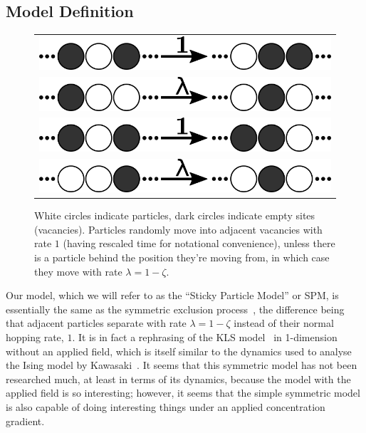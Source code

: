 \subsection{Model Definition}
\begin{figure}
\vspace{1em}
\caption{\label{fig:rates} White circles indicate particles, dark circles indicate empty sites (vacancies). Particles randomly move into adjacent vacancies with rate $1$ (having rescaled time for notational convenience), unless there is a
particle behind the position they're moving from, in which case they move with rate $\lambda=1-\zeta$.}
 \begin{tabular}{c}
    \includegraphics[width=\linewidth]{../tex-src/images/rateDiags/freeLeft} \\
    \includegraphics[width=\linewidth]{../tex-src/images/rateDiags/stickLeft} \\
    \includegraphics[width=\linewidth]{../tex-src/images/rateDiags/freeRight} \\
    \includegraphics[width=\linewidth]{../tex-src/images/rateDiags/stickRight} \\
    \end{tabular}
    \vspace{-1em}
\end{figure}
Our model, which we will refer to as the ``Sticky Particle Model'' or SPM, is essentially the same as the symmetric exclusion process~\cite{sugden2007dynamically}, the difference being that adjacent particles separate with rate $\lambda=1-\zeta$
instead of their normal hopping rate, $1$. It is in fact a rephrasing of the KLS model~\cite{Katz1984, Zia2010} in 1-dimension without an applied field, which is itself similar to the dynamics used to analyse the Ising model by
Kawasaki~\cite{PhysRev.145.224}. It seems that this symmetric model has not been researched much, at least in terms of its dynamics, because the model with the applied field is so interesting; however, it seems that the simple symmetric model
is also capable of doing interesting things under an applied concentration gradient.

